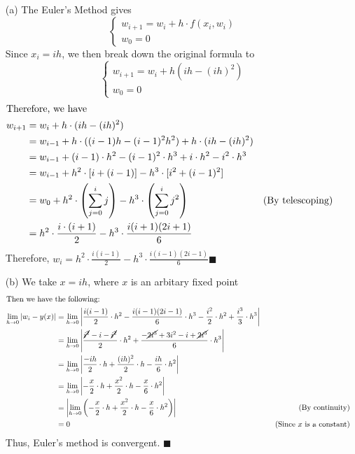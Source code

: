 \documentclass[11pt]{article}
\begin{document}
\begin{itemize}
	\item [(a)]
	The Euler's Method gives
	\[ \begin{cases}
	w_{i+1} = w_i + h\cdot f(x_i, w_i)\\
	w_0 = 0
	\end{cases} \]
	Since $ x_i = ih $, we then break down the original formula to 
	\[ \begin{cases}
	w_{i+1} = w_i + h(ih - (ih)^2)\\
	w_0 = 0
	\end{cases} \]
	\begin{align*}
	\intertext{Therefore, we have }
	w_{i+1} &= w_i + h\cdot (ih - (ih)^2 )\\
	&= w_{i-1} + h\cdot ((i-1)h - (i-1)^2 h^2) + h\cdot (ih - (ih)^2)\\
	&= w_{i-1} + (i-1)\cdot h^2 - (i-1)^2\cdot h^3 + i \cdot h^2 - i^2\cdot h^3\\
	&= w_{i-1} + h^2 \cdot [i + (i-1)] - h^3\cdot [i^2 + (i-1)^2] \\
	&= w_0 + h^2\cdot \left(\sum_{j=0}^{i}j\right) - h^3\cdot \left(\sum_{j=0}^{i}j^2\right) && (\text{By telescoping})\\
	&= h^2 \cdot \frac{i\cdot (i+1)}{2} - h^3\cdot \frac{i(i+1)(2i+1)}{6} 
	\end{align*} 
	Therefore, $ \displaystyle \boxed{w_i = h^2\cdot \frac{i(i-1)}{2} - h^3\cdot \frac{i(i-1)(2i-1)}{6} }$\hfill $ \blacksquare $\pagebreak
	
	\item [(b)]
	We take $ x = ih $, where $ x $ is an arbitary fixed point
	\begin{align*}
	\intertext{Then we have the following: }
	\lim_{h\rightarrow 0} \left|w_i - y(x)\right| &= \lim_{h\rightarrow 0} \left|\frac{i(i-1)}{2}\cdot h^2 - \frac{i(i-1)(2i-1)}{6}\cdot h^3 - \frac{i^2}{2}\cdot h^2 + \frac{i^3}{3}\cdot h^3\right| \\
	&= \lim_{h\rightarrow 0} \left|\frac{ \cancel{i^2} - i - \cancel{i^2}}{2}\cdot h^2 + \frac{-\cancel{2i^3}+3i^2-i+\cancel{2i^3}}{6}\cdot h^3\right|\\
	&= \lim_{h\rightarrow 0} \left| \frac{-ih}{2}\cdot h + \frac{(ih)^2}{2}\cdot h - \frac{ih}{6}\cdot h^2 \right|\\
	&= \lim_{h\rightarrow 0} \left| -\frac{x}{2}\cdot h + \frac{x^2}{2}\cdot h - \frac{x}{6}\cdot h^2 \right|\\
	& = \left| \lim_{h\rightarrow 0} \left( -\frac{x}{2}\cdot h + \frac{x^2}{2}\cdot h - \frac{x}{6}\cdot h^2 \right) \right|&& &\text{(By continuity)}&\\
	& = 0 && &\text{(Since $ x $ is a constant)}&
	\end{align*}
	Thus, Euler's method is convergent. \hfill $ \blacksquare $
\end{itemize}
\end{document}
